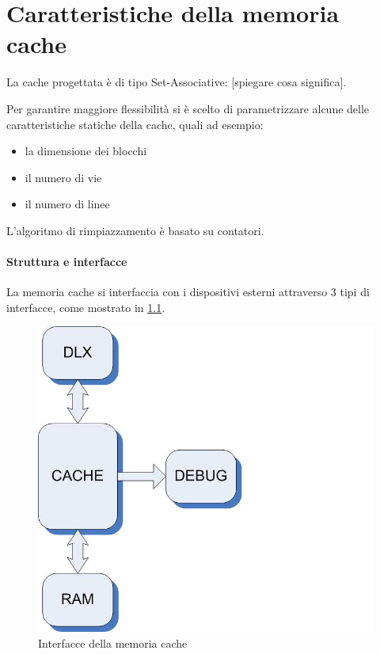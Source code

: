 \clearpage{\pagestyle{empty}\cleardoublepage}
\chapter{Caratteristiche della memoria cache}


La cache progettata \`e di tipo Set-Associative: [spiegare cosa significa].


Per garantire maggiore flessibilit\`a si \`e scelto di parametrizzare alcune delle caratteristiche statiche della cache, quali ad esempio:
\begin{itemize}
\item la dimensione dei blocchi
\item	il numero di vie 
\item il numero di linee
\end{itemize}


L'algoritmo di rimpiazzamento \`e basato su contatori.


\subsubsection{Struttura e interfacce}
La memoria cache si interfaccia con i dispositivi esterni attraverso 3 tipi di interfacce, come mostrato in \ref{fig:int_gen}.

\begin{figure}[!h]
 \centering
\includegraphics{img/01-interfacce_schema_generale.jpg}
 \caption{Interfacce della memoria cache}
 \label{fig:int_gen}
\end{figure}
